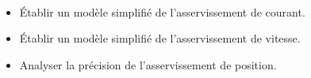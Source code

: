 \begin{obj} ~\\
%
\begin{itemize}
\item Établir un modèle simplifié de l'asservissement de courant.
\item Établir un modèle simplifié de l'asservissement de vitesse.
\item Analyser la précision de l'asservissement de position.
\end{itemize}
\end{obj}
%
%
%
%
%
%
%
%
%
%
%
%
%
